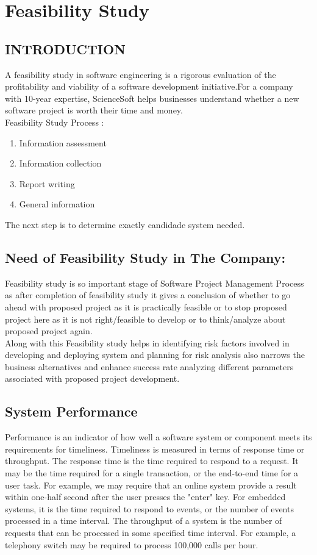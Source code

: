 \documentclass[a4paper,12pt]{book}
\begin{document}
	\chapter{Feasibility Study}
	\section{INTRODUCTION}
	A feasibility study in software engineering is a rigorous evaluation of the profitability and viability of a software development initiative.For a  company with 10-year expertise, ScienceSoft helps businesses understand whether a new software project is worth their time and money.
	\\Feasibility Study Process : \\
	\begin{enumerate}
	\item	Information assessment
	\item Information collection
	\item Report writing
	\item General information
		\end{enumerate}
	The next step is to determine exactly candidade system needed.\\
	\section{Need of Feasibility Study in The Company:} 
	Feasibility study is so important stage of Software Project Management Process as after completion of feasibility study it gives a conclusion of whether to go ahead with proposed project as it is practically feasible or to stop proposed project here as it is not right/feasible to develop or to think/analyze about proposed project again.\\
	Along with this Feasibility study helps in identifying risk factors involved in developing and deploying system and planning for risk analysis also narrows the business alternatives and enhance success rate analyzing different parameters associated with proposed project development.
	\section{System Performance}
	Performance is an indicator of how well a software system or component meets its requirements for timeliness. Timeliness is measured in terms of response time or throughput. The response time is the time required to respond to a request. It may be the time required for a single transaction, or the end-to-end time for a user task. For example, we may require that an online system provide a result within one-half second after the user presses the "enter" key. For embedded systems, it is the time required to respond to events, or the number of events processed in a time interval. The throughput of a system is the number of requests that can be processed in some specified time interval. For example, a telephony switch may be required to process 100,000 calls per hour.
	
\end{document}
